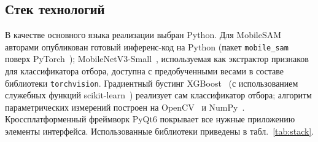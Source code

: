 \subsection{Стек технологий}
\label{sec:stack}

В качестве основного языка реализации выбран Python. Для MobileSAM авторами опубликован
готовый инференс-код на Python (пакет \texttt{mobile\_sam} поверх PyTorch~\cite{Paszke2019});
MobileNetV3-Small~\cite{Howard2019}, используемая как экстрактор признаков для классификатора
отбора, доступна с предобученными весами в составе библиотеки \texttt{torchvision}. Градиентный
бустинг XGBoost~\cite{Chen2016XGBoost} (с использованием служебных функций
scikit-learn~\cite{Pedregosa2011}) реализует сам классификатор отбора; алгоритм
параметрических измерений построен на OpenCV~\cite{Bradski2000} и NumPy~\cite{Harris2020NumPy}.
Кроссплатформенный фреймворк PyQt6 покрывает все нужные приложению элементы интерфейса.
Использованные библиотеки приведены в табл.~\ref{tab:stack}.

\begin{table}[H]
\centering
\caption{Использованные технологии}
\label{tab:stack}
\end{table}

